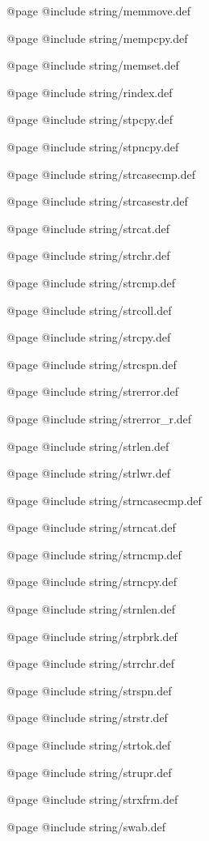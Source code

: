 @page
@include string/memmove.def

@page
@include string/mempcpy.def

@page
@include string/memset.def

@page
@include string/rindex.def

@page
@include string/stpcpy.def

@page
@include string/stpncpy.def

@page
@include string/strcasecmp.def

@page
@include string/strcasestr.def

@page
@include string/strcat.def

@page
@include string/strchr.def

@page
@include string/strcmp.def

@page
@include string/strcoll.def

@page
@include string/strcpy.def

@page
@include string/strcspn.def

@page
@include string/strerror.def

@page
@include string/strerror_r.def

@page
@include string/strlen.def

@page
@include string/strlwr.def

@page
@include string/strncasecmp.def

@page
@include string/strncat.def

@page
@include string/strncmp.def

@page
@include string/strncpy.def

@page
@include string/strnlen.def

@page
@include string/strpbrk.def

@page
@include string/strrchr.def

@page
@include string/strspn.def

@page
@include string/strstr.def

@page
@include string/strtok.def

@page
@include string/strupr.def

@page
@include string/strxfrm.def

@page
@include string/swab.def

